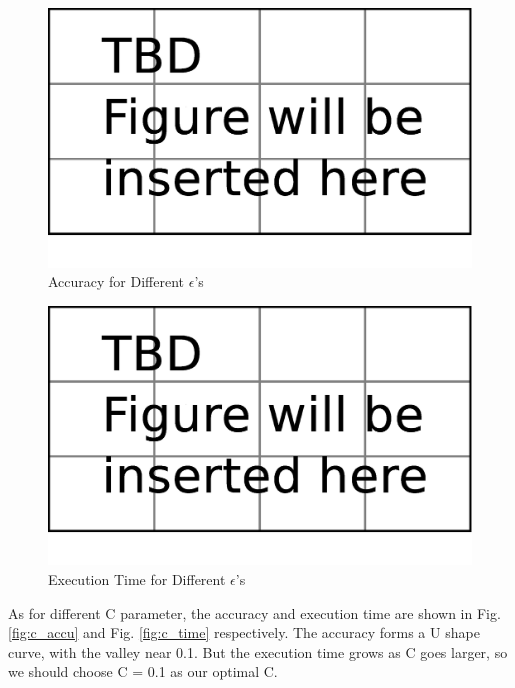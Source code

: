 \begin{figure}[tp]
   \begin{center}
      \includegraphics[width=\textwidth]{fig/TBDFigure}

   \end{center}
   \caption{Accuracy for Different $\epsilon$'s}
   \label{fig:eps_accu}
\end{figure}
\begin{figure}[tp]
   \begin{center}
      \includegraphics[width=\textwidth]{fig/TBDFigure}

   \end{center}
   \caption{Execution Time for Different $\epsilon$'s}
   \label{fig:eps_time}
\end{figure}

As for different C parameter, the accuracy and execution time are shown in Fig.\ref{fig:c_accu} and Fig. \ref{fig:c_time} respectively. The accuracy forms a U shape curve, with the valley near 0.1. But the execution time grows as C goes larger, so we should choose C = 0.1 as our optimal C.

